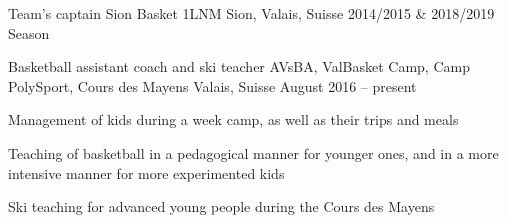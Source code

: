 

\begin{cventries}

  \cventry
    {Team's captain} %
    {Sion Basket 1LNM} %
    {Sion, Valais, Suisse} %
    {2014/2015 \& 2018/2019 Season} %
    {}

\cventry
    {Basketball assistant coach and ski teacher} %
    {AVsBA, ValBasket Camp, Camp PolySport, Cours des Mayens} %
    {Valais, Suisse} %
    {August 2016 -- present} %
    {
      \begin{cvitems} %
        \item {Management of kids during a week camp, as well as their trips and meals}
        \item {Teaching of basketball in a pedagogical manner for younger ones, and in a more intensive manner for more experimented kids}
        \item{Ski teaching for advanced young people during the Cours des Mayens}
      \end{cvitems}
    }
    
    

\end{cventries}

